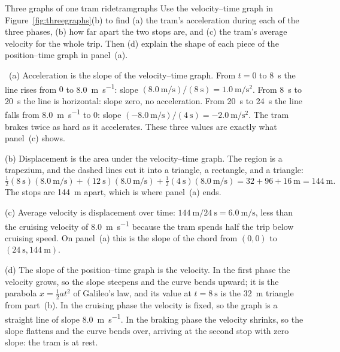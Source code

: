 \documentclass[11pt,twoside,openany]{book}
\newcommand{\viewtag}[3]{\fcolorbox{#2}{#3}{\footnotesize\textbf{\textcolor{#2}{#1}}}}
\newcommand{\elemtag}{\viewtag{Elementary}{elemcol}{elempale}}
\newcommand{\elem}{\par\medskip\noindent\elemtag\ }
\begin{document}
\begin{example}{Three graphs of one tram ride}{tramgraphs}
Use the velocity--time graph in Figure~\ref{fig:threegraphs}(b) to find (a) the tram's acceleration during each of the three phases, (b) how far apart the two stops are, and (c) the tram's average velocity for the whole trip. Then (d) explain the shape of each piece of the position--time graph in panel~(a).

\elem (a) Acceleration is the slope of the velocity--time graph. From $t = 0$ to \SI{8}{\second} the line rises from $0$ to \SI{8.0}{\metre\per\second}: slope $(\SI{8.0}{\metre\per\second})/(\SI{8}{\second}) = \SI{1.0}{\metre\per\second\squared}$. From \SI{8}{\second} to \SI{20}{\second} the line is horizontal: slope zero, no acceleration. From \SI{20}{\second} to \SI{24}{\second} the line falls from \SI{8.0}{\metre\per\second} to $0$: slope $(\SI{-8.0}{\metre\per\second})/(\SI{4}{\second}) = \SI{-2.0}{\metre\per\second\squared}$. The tram brakes twice as hard as it accelerates. These three values are exactly what panel~(c) shows.

(b) Displacement is the area under the velocity--time graph. The region is a trapezium, and the dashed lines cut it into a triangle, a rectangle, and a triangle:
\[
\tfrac12(\SI{8}{\second})(\SI{8.0}{\metre\per\second}) + (\SI{12}{\second})(\SI{8.0}{\metre\per\second}) + \tfrac12(\SI{4}{\second})(\SI{8.0}{\metre\per\second}) = 32 + 96 + 16\ \si{\metre} = \SI{144}{\metre}.
\]
The stops are \SI{144}{\metre} apart, which is where panel~(a) ends.

(c) Average velocity is displacement over time: $\SI{144}{\metre}/\SI{24}{\second} = \SI{6.0}{\metre\per\second}$, less than the cruising velocity of \SI{8.0}{\metre\per\second} because the tram spends half the trip below cruising speed. On panel~(a) this is the slope of the chord from $(0, 0)$ to $(\SI{24}{\second}, \SI{144}{\metre})$.

(d) The slope of the position--time graph is the velocity. In the first phase the velocity grows, so the slope steepens and the curve bends upward; it is the parabola $x = \tfrac12 a t^2$ of Galileo's law, and its value at $t = \SI{8}{\second}$ is the \SI{32}{\metre} triangle from part~(b). In the cruising phase the velocity is fixed, so the graph is a straight line of slope \SI{8.0}{\metre\per\second}. In the braking phase the velocity shrinks, so the slope flattens and the curve bends over, arriving at the second stop with zero slope: the tram is at rest.


\end{example}
\end{document}
